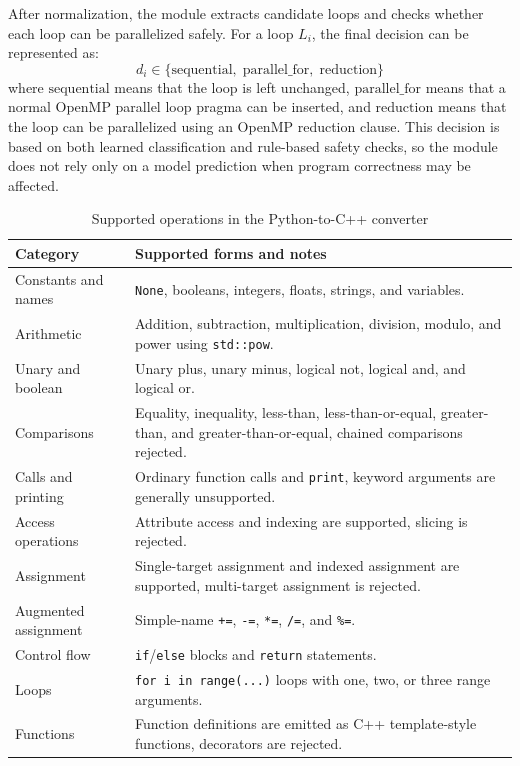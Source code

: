 After normalization, the module extracts candidate loops and checks whether each loop
can be parallelized safely. For a loop \(L_i\), the final decision can be represented as:
\[
d_i \in \{\text{sequential},\; \text{parallel\_for},\; \text{reduction}\}
\]
where \(\text{sequential}\) means that the loop is left unchanged,
\(\text{parallel\_for}\) means that a normal OpenMP parallel loop pragma can be
inserted, and \(\text{reduction}\) means that the loop can be parallelized using an
OpenMP reduction clause. This decision is based on both learned classification and
rule-based safety checks, so the module does not rely only on a model prediction when
program correctness may be affected.

\begin{table}[H]
\centering
\small
\renewcommand{\arraystretch}{1.15}
\setlength{\tabcolsep}{4pt}
\caption{Supported operations in the Python-to-C++ converter}
\begin{tabular}{p{}p{}}
\toprule
Category & Supported forms and notes \\
\midrule
Constants and names & \texttt{None}, booleans, integers, floats, strings, and variables. \\
\midrule
Arithmetic & Addition, subtraction, multiplication, division, modulo, and power using \texttt{std::pow}. \\
\midrule
Unary and boolean & Unary plus, unary minus, logical not, logical and, and logical or. \\
\midrule
Comparisons & Equality, inequality, less-than, less-than-or-equal, greater-than, and greater-than-or-equal, chained comparisons rejected. \\
\midrule
Calls and printing & Ordinary function calls and \texttt{print}, keyword arguments are generally unsupported. \\
\midrule
Access operations & Attribute access and indexing are supported, slicing is rejected. \\
\midrule
Assignment & Single-target assignment and indexed assignment are supported, multi-target assignment is rejected. \\
\midrule
Augmented assignment & Simple-name \texttt{+=}, \texttt{-=}, \texttt{*=}, \texttt{/=}, and \texttt{\%=}. \\
\midrule
Control flow & \texttt{if}/\texttt{else} blocks and \texttt{return} statements. \\
\midrule
Loops & \texttt{for i in range(...)} loops with one, two, or three range arguments. \\
\midrule
Functions & Function definitions are emitted as C++ template-style functions, decorators are rejected. \\
\bottomrule
\end{tabular}
\end{table}

